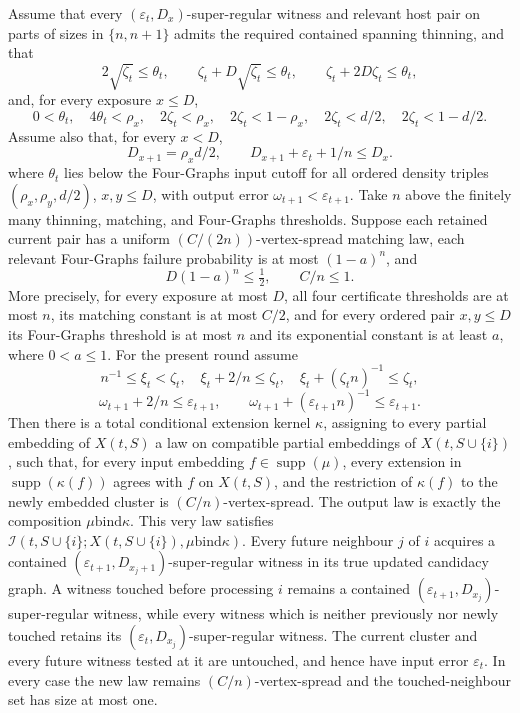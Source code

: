 \begin{lemma}
Assume that every \((\varepsilon_t,D_x)\)-super-regular witness and relevant
host pair on parts of sizes in \(\{n,n+1\}\) admits the required contained
spanning thinning, and that
\[
 2\sqrt{\zeta_t}\leq\theta_t,\qquad
 \zeta_t+D\sqrt{\zeta_t}\leq\theta_t,\qquad
 \zeta_t+2D\zeta_t\leq\theta_t,
\]
and, for every exposure \(x\leq D\),
\[
 0<\theta_t,\quad 4\theta_t<\rho_x,\quad
 2\zeta_t<\rho_x,\quad 2\zeta_t<1-\rho_x,\quad
 2\zeta_t<d/2,\quad 2\zeta_t<1-d/2.
\]
Assume also that, for every \(x<D\),
\[
 D_{x+1}=\rho_xd/2,
 \qquad D_{x+1}+\varepsilon_t+1/n\leq D_x.
\]
where \(\theta_t\) lies below the Four-Graphs input cutoff for all ordered
density triples \((\rho_x,\rho_y,d/2)\), \(x,y\leq D\), with output error
\(\omega_{t+1}<\varepsilon_{t+1}\). Take \(n\) above the finitely many
thinning, matching, and Four-Graphs thresholds. Suppose each retained current
pair has a uniform \((C/(2n))\)-vertex-spread matching law, each relevant
Four-Graphs failure probability is at most \((1-a)^n\), and
\[
 D(1-a)^n\leq\tfrac12,\qquad C/n\leq1.
\]
More precisely, for every exposure at most \(D\), all four certificate
thresholds are at most \(n\), its matching constant is at most \(C/2\), and
for every ordered pair \(x,y\leq D\) its Four-Graphs threshold is at most \(n\) and
its exponential constant is at least \(a\), where \(0<a\leq1\). For the
present round assume
\[
 n^{-1}\leq\xi_t<\zeta_t,\quad \xi_t+2/n\leq\zeta_t,\quad
 \xi_t+(\zeta_tn)^{-1}\leq\zeta_t,
\]
\[
 \omega_{t+1}+2/n\leq\varepsilon_{t+1},\qquad
 \omega_{t+1}+(\varepsilon_{t+1}n)^{-1}\leq\varepsilon_{t+1}.
\]
Then there is a total conditional extension kernel \(\kappa\), assigning to
every partial embedding of \(X(t,S)\) a law on compatible partial embeddings
of \(X(t,S\cup\{i\})\), such that, for every input embedding
\(f\in\operatorname{supp}(\mu)\), every extension in
\(\operatorname{supp}(\kappa(f))\) agrees with \(f\) on \(X(t,S)\), and the
restriction of \(\kappa(f)\) to the newly embedded cluster is
\((C/n)\)-vertex-spread. The
output law is exactly the composition
\(\mu\mathbin{\mathrm{bind}}\kappa\).  This very law satisfies
\(\mathcal I(t,S\cup\{i\};X(t,S\cup\{i\}),\mu\mathbin{\mathrm{bind}}\kappa)\).
Every future
neighbour \(j\) of \(i\) acquires a contained
\((\varepsilon_{t+1},D_{x_j+1})\)-super-regular witness in its true updated
candidacy graph. A witness touched before processing \(i\) remains a contained
\((\varepsilon_{t+1},D_{x_j})\)-super-regular witness, while every witness
which is neither previously nor newly touched retains its
\((\varepsilon_t,D_{x_j})\)-super-regular witness.  The current cluster and
every future witness tested at it are untouched, and hence have input error
\(\varepsilon_t\).  In every case the new law remains
\((C/n)\)-vertex-spread and the touched-neighbour set has size at most one.

\end{lemma}
